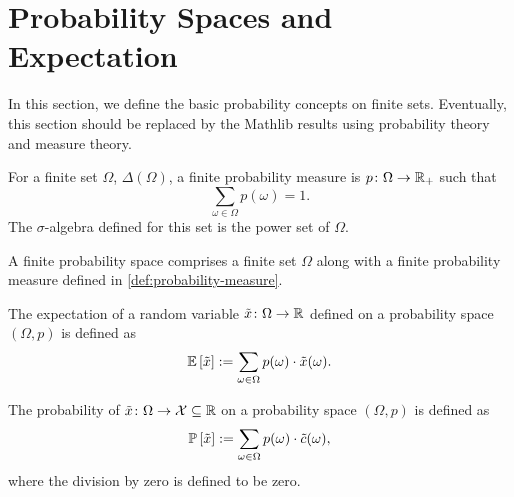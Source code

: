 %


\section{Probability Spaces and Expectation}

In this section, we define the basic probability concepts on finite sets. Eventually, this section should be replaced by the Mathlib results using probability theory and measure theory.

\begin{definition} \label{def:probability-measure}
  For a finite set $\Omega$, $\Delta(\Omega)$, a finite probability measure is  $p\colon \Omega \to \Real_+$ such that
  \[
   \sum_{\omega \in \Omega } p(\omega) = 1. 
 \]
 The $\sigma$-algebra defined for this set is the power set of $\Omega$.
  \leanok
\end{definition}

\begin{definition} \label{def:probability-space}
  A finite probability space comprises a finite set $\Omega$ along with a finite probability measure defined in \cref{def:probability-measure}.
  \leanok
\end{definition}

\begin{definition}[Expectation]
  The expectation of a random variable $\tilde{x} \colon \Omega \to \Real$ defined on a probability space $(\Omega, p)$ is defined as
  \[
    \E \left[ \tilde{x} \right] := \sum_{\omega \in \Omega } p(\omega ) \cdot \tilde{x}(\omega).
  \]
  \leanok
\end{definition}


\begin{definition}
  The probability of $\tilde{x}\colon \Omega \to \mathcal{X} \subseteq \Real$ on a probability space $(\Omega, p)$ is defined as
  \[
    \P \left[ \tilde{x} \right] := \sum_{\omega \in \Omega } p(\omega) \cdot \tilde{c}(\omega),
  \]
  where the division by zero is defined to be zero.
\end{definition}

